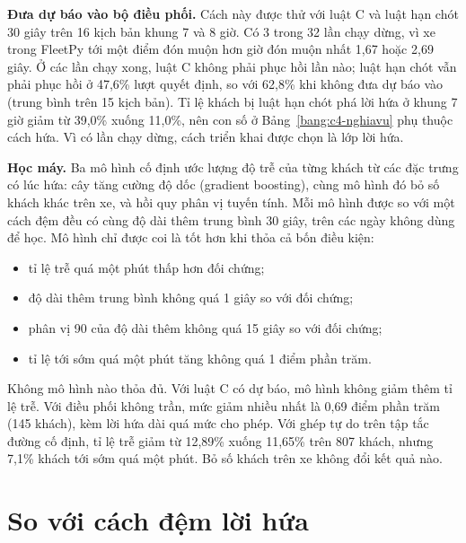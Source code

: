\textbf{Đưa dự báo vào bộ điều phối.} Cách này được thử với luật C và luật hạn chót 30 giây trên 16 kịch bản khung 7
và 8 giờ. Có 3 trong 32 lần chạy dừng, vì xe trong FleetPy tới một điểm đón muộn hơn giờ đón muộn nhất 1,67 hoặc
2,69 giây. Ở các lần chạy xong, luật C không phải phục hồi lần nào; luật hạn chót vẫn phải phục hồi ở 47,6\% lượt
quyết định, so với 62,8\% khi không đưa dự báo vào (trung bình trên 15 kịch bản). Tỉ lệ khách bị luật hạn chót phá
lời hứa ở khung 7 giờ giảm từ 39,0\% xuống 11,0\%, nên con số ở Bảng~\ref{bang:c4-nghiavu} phụ thuộc cách hứa. Vì có
lần chạy dừng, cách triển khai được chọn là lớp lời hứa.

\textbf{Học máy.} Ba mô hình cố định ước lượng độ trễ của từng khách từ các đặc trưng có lúc hứa: cây tăng cường độ
dốc (gradient boosting), cùng mô hình đó bỏ số khách khác trên xe, và hồi quy phân vị tuyến tính. Mỗi mô hình được so
với một cách đệm đều có cùng độ dài thêm trung bình 30 giây, trên các ngày không dùng để học. Mô hình chỉ được coi là
tốt hơn khi thỏa cả bốn điều kiện:
\begin{itemize}[leftmargin=1.2cm,itemsep=0pt,topsep=2pt]
\item tỉ lệ trễ quá một phút thấp hơn đối chứng;
\item độ dài thêm trung bình không quá 1 giây so với đối chứng;
\item phân vị 90 của độ dài thêm không quá 15 giây so với đối chứng;
\item tỉ lệ tới sớm quá một phút tăng không quá 1 điểm phần trăm.
\end{itemize}

Không mô hình nào thỏa đủ. Với luật C có dự báo, mô hình không giảm thêm tỉ lệ trễ. Với điều phối không trần, mức
giảm nhiều nhất là 0,69 điểm phần trăm (145 khách), kèm lời hứa dài quá mức cho phép. Với ghép tự do trên tập tắc
đường cố định, tỉ lệ trễ giảm từ 12,89\% xuống 11,65\% trên 807 khách, nhưng 7,1\% khách tới sớm quá một phút. Bỏ
số khách trên xe không đổi kết quả nào.

\section{So với cách đệm lời hứa}
\label{muc:c4-dem}


